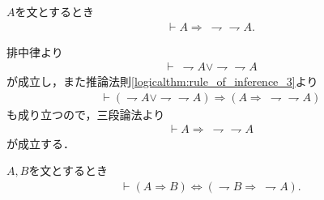	\begin{screen}
		\begin{logicalthm}[二重否定の法則の逆が成り立つ]\label{logicalthm:converse_of_law_of_double_negative}
			$A$を文とするとき
			\begin{align}
				\vdash A \Longrightarrow\ \rightharpoondown \rightharpoondown A.
			\end{align}
		\end{logicalthm}
	\end{screen}
	
	\begin{prf}
		排中律より
		\begin{align}
			\vdash\ \rightharpoondown A \vee \rightharpoondown \rightharpoondown A
		\end{align}
		が成立し，また推論法則\ref{logicalthm:rule_of_inference_3}より
		\begin{align}
			\vdash (\rightharpoondown A \vee \rightharpoondown \rightharpoondown A)
			\Longrightarrow (A \Longrightarrow\ \rightharpoondown \rightharpoondown A)
		\end{align}
		も成り立つので，三段論法より
		\begin{align}
			\vdash A \Longrightarrow\ \rightharpoondown \rightharpoondown A
		\end{align}
		が成立する．
		\QED
	\end{prf}
	
	\begin{screen}
		\begin{logicalthm}[対偶命題は同値]\label{thm:contraposition_is_true}
			$A,B$を文とするとき
			\begin{align}
				\vdash (A \Longrightarrow B) \Longleftrightarrow (\rightharpoondown B \Longrightarrow\ \rightharpoondown A).
			\end{align}
		\end{logicalthm}
	\end{screen}
	
